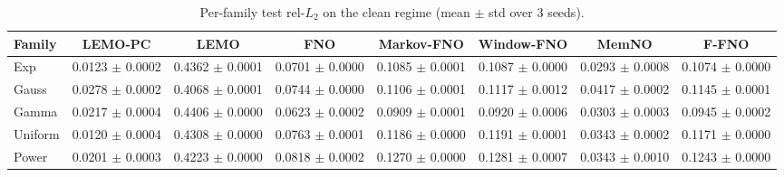 \begin{table}[h]
\centering
\caption{Per-family test rel-$L_2$ on the clean regime (mean $\pm$ std over 3 seeds).}
\label{tab:perfamily}
\begin{tabular}{lccccccc}
\toprule
Family & \textbf{LEMO-PC} & LEMO & FNO & Markov-FNO & Window-FNO & MemNO & F-FNO \\
\midrule
Exp & 0.0123 $\pm$ 0.0002 & 0.4362 $\pm$ 0.0001 & 0.0701 $\pm$ 0.0000 & 0.1085 $\pm$ 0.0001 & 0.1087 $\pm$ 0.0000 & 0.0293 $\pm$ 0.0008 & 0.1074 $\pm$ 0.0000 \\
Gauss & 0.0278 $\pm$ 0.0002 & 0.4068 $\pm$ 0.0001 & 0.0744 $\pm$ 0.0000 & 0.1106 $\pm$ 0.0001 & 0.1117 $\pm$ 0.0012 & 0.0417 $\pm$ 0.0002 & 0.1145 $\pm$ 0.0001 \\
Gamma & 0.0217 $\pm$ 0.0004 & 0.4406 $\pm$ 0.0000 & 0.0623 $\pm$ 0.0002 & 0.0909 $\pm$ 0.0001 & 0.0920 $\pm$ 0.0006 & 0.0303 $\pm$ 0.0003 & 0.0945 $\pm$ 0.0002 \\
Uniform & 0.0120 $\pm$ 0.0004 & 0.4308 $\pm$ 0.0000 & 0.0763 $\pm$ 0.0001 & 0.1186 $\pm$ 0.0000 & 0.1191 $\pm$ 0.0001 & 0.0343 $\pm$ 0.0002 & 0.1171 $\pm$ 0.0000 \\
Power & 0.0201 $\pm$ 0.0003 & 0.4223 $\pm$ 0.0000 & 0.0818 $\pm$ 0.0002 & 0.1270 $\pm$ 0.0000 & 0.1281 $\pm$ 0.0007 & 0.0343 $\pm$ 0.0010 & 0.1243 $\pm$ 0.0000 \\
\bottomrule
\end{tabular}
\end{table}